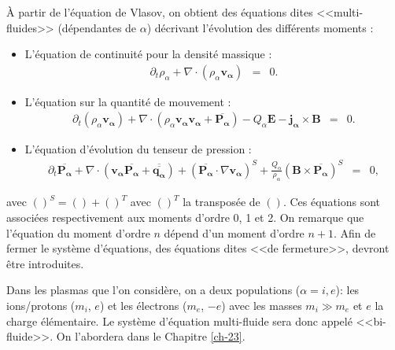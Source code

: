 À partir de l'équation de Vlasov, on obtient des équations dites <<multi-fluides>> (dépendantes de $\alpha$) décrivant l'évolution des différents moments :
\begin{itemize}
    \item L'équation de continuité pour la densité massique :
\begin{eqnarray}
  \label{eq:model_0_multi} \partial_t \rho_{\alpha} + \nabla \cdot \left(\rho_{\alpha} \boldsymbol{v_{\alpha}}\right) &=& 0.
 \end{eqnarray}
    \item L'équation sur la quantité de mouvement :
\begin{eqnarray}
  \label{eq:model_1_multi} \partial_t \left(\rho_{\alpha} \boldsymbol{v_{\alpha}}\right) + \nabla \cdot \left(\rho_{\alpha} \boldsymbol{v_{\alpha}}\boldsymbol{v_{\alpha}} + \overline{\boldsymbol{P_{\alpha}}}\right) - Q_{\alpha} \boldsymbol{E} - \boldsymbol{j_{\alpha}} \times \boldsymbol{B} &=& 0.
 \end{eqnarray}
 \item L'équation d'évolution du tenseur de pression :
\begin{eqnarray}
  \label{eq:model_2_multi} \partial_t \overline{\boldsymbol{P_{\alpha}}} + \nabla \cdot \left(\boldsymbol{v_{\alpha}}\overline{\boldsymbol{P_{\alpha}}} + \overline{\overline{\boldsymbol{q_{\alpha}}}}\right) + \left(\overline{\boldsymbol{P_{\alpha}}} \cdot \nabla \boldsymbol{v_{\alpha}}\right)^S +  \frac{Q_{\alpha}}{\rho_{\alpha}} \left(\boldsymbol{B}\times \overline{\boldsymbol{P_{\alpha}}}\right)^S  &=& 0 ,
\end{eqnarray}
\end{itemize}
avec $\left( \right)^S = \left( \right) + \left( \right)^T$ avec $\left( \right)^T$ la transposée de $\left( \right)$. Ces équations sont associées respectivement aux moments d'ordre 0, 1 et 2. On remarque que l'équation du moment d'ordre $n$ dépend d'un moment d'ordre $n+1$. Afin de fermer le système d'équations, des équations dites <<de fermeture>>, devront être introduites. 

Dans les plasmas que l'on considère, on a deux populations ($\alpha = i,e$): les ions/protons ($m_i$, $e$) et les électrons ($m_e$, $-e$) avec les masses $m_i \gg m_e$ et $e$ la charge élémentaire. Le système d'équation multi-fluide sera donc appelé <<bi-fluide>>. On l'abordera dans le Chapitre \ref{ch-23}. 

